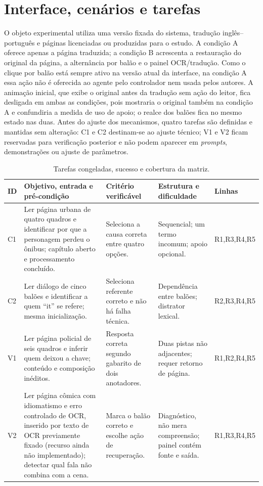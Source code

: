\documentclass[conference]{IEEEtran}
\begin{document}
\section{Interface, cenários e tarefas}
O objeto experimental utiliza uma versão fixada do sistema, tradução inglês--português e páginas licenciadas ou produzidas para o estudo. A condição A oferece apenas a página traduzida; a condição B acrescenta a restauração do original da página, a alternância por balão e o painel OCR/tradução. Como o clique por balão está sempre ativo na versão atual da interface, na condição A essa ação não é oferecida ao agente pelo controlador nem usada pelos autores. A animação inicial, que exibe o original antes da tradução sem ação do leitor, fica desligada em ambas as condições, pois mostraria o original também na condição A e confundiria a medida de uso de apoio; o realce dos balões fica no mesmo estado nas duas. Antes do ajuste dos mecanismos, quatro tarefas são definidas e mantidas sem alteração: C1 e C2 destinam-se ao ajuste técnico; V1 e V2 ficam reservadas para verificação posterior e não podem aparecer em \emph{prompts}, demonstrações ou ajuste de parâmetros.

\begin{table}[t]
\caption{Tarefas congeladas, sucesso e cobertura da matriz.}
\label{tab:tasks}
\centering\scriptsize
\begin{tabularx}{\textwidth}{p{0.7cm}Y Y Y p{1.5cm}}
\toprule
ID & Objetivo, entrada e pré-condição & Critério verificável & Estrutura e dificuldade & Linhas \\
\midrule
C1 & Ler página urbana de quatro quadros e identificar por que a personagem perdeu o ônibus; capítulo aberto e processamento concluído. & Seleciona a causa correta entre quatro opções. & Sequencial; um termo incomum; apoio opcional. & R1,R3,R4,R5 \\
C2 & Ler diálogo de cinco balões e identificar a quem ``it'' se refere; mesma inicialização. & Seleciona referente correto e não há falha técnica. & Dependência entre balões; distrator lexical. & R2,R3,R4,R5 \\
V1 & Ler página policial de seis quadros e inferir quem deixou a chave; conteúdo e composição inéditos. & Resposta correta segundo gabarito de dois anotadores. & Duas pistas não adjacentes; requer retorno de página. & R1,R2,R4,R5 \\
V2 & Ler página cômica com idiomatismo e erro controlado de OCR, inserido por texto de OCR previamente fixado (recurso ainda não implementado); detectar qual fala não combina com a cena. & Marca o balão correto e escolhe ação de recuperação. & Diagnóstico, não mera compreensão; painel contém fonte e saída. & R1,R3,R4,R5 \\
\bottomrule
\end{tabularx}
\end{table}
\end{document}

